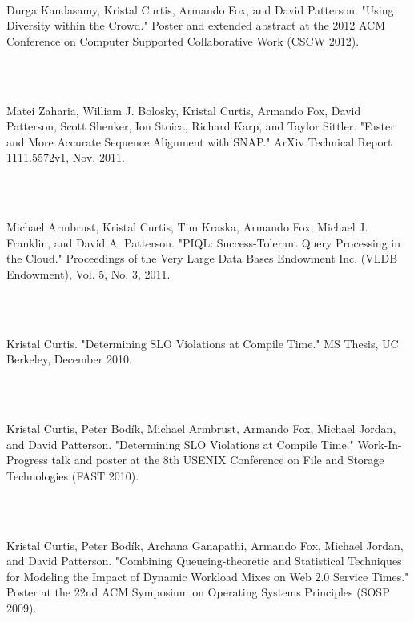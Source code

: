 \documentclass[11pt]{article}
\newcommand{\pagewidth}{6.5 in}
\newcommand{\tabwidth}{2.0 in}
\begin{document}
\begin{tabbing}
\hspace{\tabwidth} \= \\ 

\parbox[t]{\pagewidth}{Durga Kandasamy, Kristal Curtis, Armando Fox, and David Patterson.  "Using Diversity within the Crowd."  Poster and extended abstract at the 2012 ACM Conference on Computer Supported Collaborative Work (CSCW 2012).}\\ \\
\parbox[t]{\pagewidth}{Matei Zaharia, William J. Bolosky, Kristal Curtis, Armando Fox, David Patterson, Scott Shenker, Ion Stoica, Richard Karp, and Taylor Sittler.  "Faster and More Accurate Sequence Alignment with SNAP."  ArXiv Technical Report 1111.5572v1, Nov. 2011.}\\ \\
\parbox[t]{\pagewidth}{Michael Armbrust, Kristal Curtis, Tim Kraska, Armando Fox, Michael J. Franklin, and David A. Patterson.  "PIQL:  Success-Tolerant Query Processing in the Cloud."  Proceedings of the Very Large Data Bases Endowment Inc. (VLDB Endowment), Vol. 5, No. 3, 2011.}\\ \\
\parbox[t]{\pagewidth}{Kristal Curtis.  "Determining SLO Violations at Compile Time."  MS Thesis, UC Berkeley, December 2010.}\\ \\
\parbox[t]{\pagewidth}{Kristal Curtis, Peter Bod\'{i}k, Michael Armbrust, Armando Fox, Michael Jordan, and David Patterson.  "Determining SLO Violations at Compile Time."  Work-In-Progress talk and poster at the 8th USENIX Conference on File and Storage Technologies (FAST 2010).}\\ \\
\parbox[t]{\pagewidth}{Kristal Curtis, Peter Bod\'{i}k, Archana Ganapathi, Armando Fox, Michael Jordan, and David Patterson.  "Combining Queueing-theoretic and Statistical Techniques for Modeling the Impact of Dynamic Workload Mixes on Web 2.0 Service Times."  Poster at the 22nd ACM Symposium on Operating Systems Principles (SOSP 2009).}\\
\end{tabbing}

\pagebreak
\end{document}
